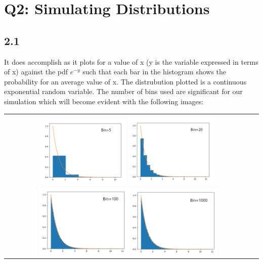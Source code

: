 \documentclass[answers]{exam}
\begin{document}
\section*{Q2: Simulating Distributions}

  \subsection*{2.1}
        It does accomplish as it plots for a value of x (y is the variable expressed in terms of x) against the pdf $e^{-y}$ such that each bar in the histogram shows the probability for an average value of x. The distrubution plotted is a continuous exponential random variable. The number of bins used are significant for our simulation which will become evident with the following images:
        \begin{center}
          \begin{tabular}{cc}
            \includegraphics[width= 0.35\textwidth]{"Q2/bin5.png"}
            \includegraphics[width= 0.36\textwidth]{"Q2/bin20.png"}\\
            \includegraphics[width= 0.375\textwidth]{"Q2/bin100.png"}
            \includegraphics[width= 0.35\textwidth]{"Q2/bin1000.png"}    
          \end{tabular}
        
       
      \end{center} 
\end{document}
